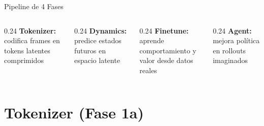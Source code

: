 \documentclass[aspectratio=169, 12pt]{beamer}
\begin{document}
\begin{frame}{Pipeline de 4 Fases}
\vspace{10pt}
\begin{columns}[T]
  \begin{column}{0.24\textwidth}
    \small\textbf{\color{phaseA}Tokenizer:} codifica frames en tokens latentes comprimidos
  \end{column}
  \begin{column}{0.24\textwidth}
    \small\textbf{\color{phaseB}Dynamics:} predice estados futuros en espacio latente
  \end{column}
  \begin{column}{0.24\textwidth}
    \small\textbf{\color{phaseC}Finetune:} aprende comportamiento y valor desde datos reales
  \end{column}
  \begin{column}{0.24\textwidth}
    \small\textbf{\color{phaseD}Agent:} mejora política en rollouts imaginados
  \end{column}
\end{columns}
\end{frame}

\section{Tokenizer (Fase 1a)}
\end{document}
